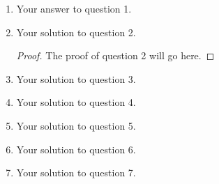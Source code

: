 \documentclass[letterpaper,12pt]{article}
\begin{document}
\begin{enumerate}
\item Your answer to question 1.

\item Your solution to question 2.
  \begin{proof}
    The proof of question 2 will go here.
  \end{proof}

 \item Your solution to question 3.
 \item Your solution to question 4.
 \item Your solution to question 5.
 \item Your solution to question 6.   
 \item Your solution to question 7.
\end{enumerate}


\end{document}
